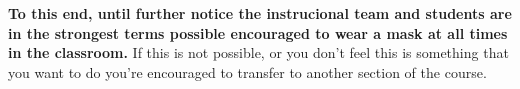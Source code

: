 \documentclass[12pt]{scrartcl}
\begin{document}
\begin{tcolorbox}[colback=red!5,colframe=red!75!black,title=Masks in the classroom]
\textbf{To this end, until further notice the instrucional team and students are in the strongest terms possible
encouraged to wear a mask at all times in the classroom.}
If this is not possible, or you don't feel this is something that you want to do you're encouraged to transfer to another section of the course. 
\end{tcolorbox}

%
%
%
\end{document}
